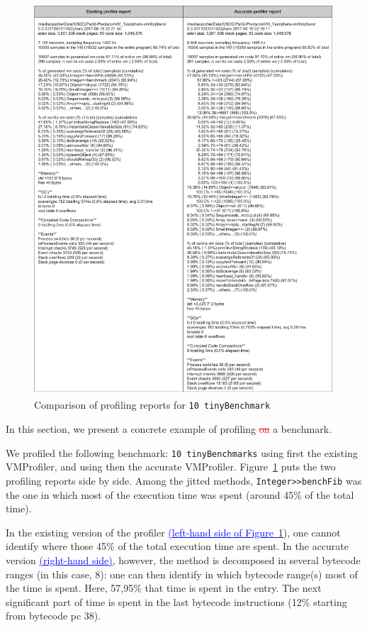 \documentclass[10pt,preprint,nonatbib]{sigplanconf}
\newcommand{\ct}{\lstinline[backgroundcolor=\color{white},basicstyle=\small\ttfamily]}
\newcommand{\ins}[1]{\textcolor{blue}{\uline{#1}}} %
\newcommand{\del}[1]{\textcolor{red}{\sout{#1}}} %
\newcommand{\figlabel}[1]{\label{fig:#1}}
\newcommand{\figref}[1]{Figure~\ref{fig:#1}}
\begin{document}
  \begin{figure}[!htp]
     \begin{center}
         \includegraphics[width=1.0\linewidth]{ReportComparison}
         \caption{Comparison of profiling reports for \ct{10 tinyBenchmark}}
         \figlabel{fig:ReportComparison}
     \end{center}
 \end{figure}

In this section, we present a concrete example of profiling \del{on} a benchmark.

We profiled the following benchmark: \ct{10 tinyBenchmarks} using first the existing VMProfiler, and using then the accurate VMProfiler. 
\figref{fig:ReportComparison} puts the two profiling reports side by side.
Among the jitted methods, \ct{Integer>>benchFib} was the one in which most of the execution time was spent (around 45\% of the total time).

In the existing version of the profiler \ins{(left-hand side of \figref{fig:ReportComparison}}), one cannot identify where those 45\% of the total execution time are spent. In the accurate version \ins{(right-hand side)}, however, the method is decomposed in several bytecode ranges (in this case, 8): one can then identify in which bytecode range(s) most of the time is spent. Here, 57,95\% that time is spent in the entry. The next significant part of time is spent in the last bytecode instructions (12\% starting from bytecode pc 38).
\end{document}
